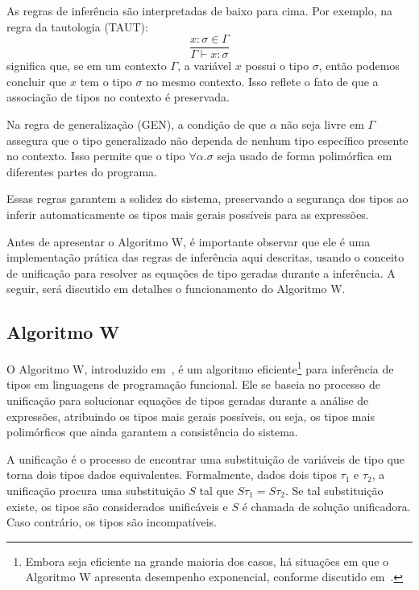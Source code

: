 As regras de inferência são interpretadas de baixo para cima.
Por exemplo, na regra da tautologia (TAUT):
\[
  \frac{x : \sigma \in \Gamma}{\Gamma \vdash x : \sigma}
\]
significa que, se em um contexto $\Gamma$, a variável $x$ possui o tipo $\sigma$, então podemos concluir que $x$ tem o tipo $\sigma$ no mesmo contexto.
Isso reflete o fato de que a associação de tipos no contexto é preservada.

Na regra de generalização (GEN), a condição de que $\alpha$ não seja livre em $\Gamma$ assegura que o tipo generalizado não dependa de nenhum tipo específico presente no contexto.
Isso permite que o tipo $\forall \alpha. \sigma$ seja usado de forma polimórfica em diferentes partes do programa.

Essas regras garantem a solidez do sistema, preservando a segurança dos tipos ao inferir automaticamente os tipos mais gerais possíveis para as expressões.

Antes de apresentar o Algoritmo W, é importante observar que ele é uma implementação prática das regras de inferência aqui descritas, usando o conceito de unificação para resolver as equações de tipo geradas durante a inferência.
A seguir, será discutido em detalhes o funcionamento do Algoritmo W.

\subsection{Algoritmo W}\label{subsec:w-algo}

O Algoritmo W, introduzido em~, é um algoritmo eficiente\footnote{Embora seja eficiente na grande maioria dos casos, há situações em que o Algoritmo W apresenta desempenho exponencial, conforme discutido em~\cite{vasconcellos2004inferencia}.} para inferência de tipos em linguagens de programação funcional.
Ele se baseia no processo de unificação para solucionar equações de tipos geradas durante a análise de expressões, atribuindo os tipos mais gerais possíveis, ou seja, os tipos mais polimórficos que ainda garantem a consistência do sistema.

A unificação é o processo de encontrar uma substituição de variáveis de tipo que torna dois tipos dados equivalentes.
Formalmente, dados dois tipos $\tau_1$ e $\tau_2$, a unificação procura uma substituição $S$ tal que $S\tau_1 = S\tau_2$.
Se tal substituição existe, os tipos são considerados unificáveis e $S$ é chamada de solução unificadora.
Caso contrário, os tipos são incompatíveis.

